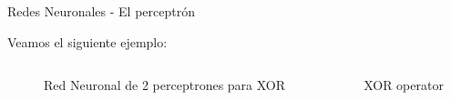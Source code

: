 \documentclass[handout, 9pt]{beamer}
\begin{document}
\begin{frame}{Redes Neuronales - El perceptrón}

Veamos el siguiente ejemplo: \pause

\begin{columns}

  \begin{column}{0.7\textwidth}

  \begin{figure}[H]
    \centering
    \caption{Red Neuronal de 2 perceptrones para XOR}
  \end{figure}

  \end{column}

  \begin{column}{0.3\textwidth}
  
  \hspace{0.4cm} XOR operator


  

  \end{column}

\end{columns} \pause


\end{frame}
\end{document}
